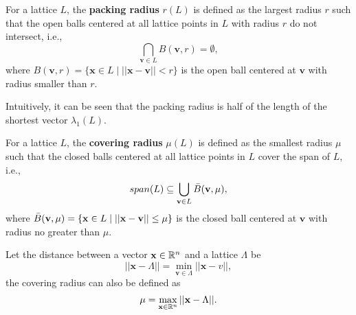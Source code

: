 \documentclass[../main.tex]{subfiles}
\begin{document}
\iffalse %
The function inside of the square root is in $\omega(\log n)$\footnote{It is called ``superlogarithm'' by \cite{micciancio07worst}.} The lemma remains true for all functions in $\omega(\log n)$. Another way of saying this is, 
\begin{equation*}
    \eta_{\epsilon}(L) \le \sqrt{\omega(\log n)} \cdot \lambda_n(L)
\end{equation*}
\fi

\iffalse
\begin{definition}
\reversemarginpar
{}
For a lattice $L$, the \textbf{packing radius} $r(L)$ is defined as the largest radius $r$ such that the open balls centered at all lattice points in $L$ with radius $r$ do not intersect, i.e.,  
\begin{equation*}
    \bigcap_{\mathbf{v} \in L} B(\mathbf{v},r) = \emptyset,
\end{equation*}
where $B(\mathbf{v},r)=\{\mathbf{x} \in L \mid ||\mathbf{x}-\mathbf{v}|| < r\}$ is the open ball centered at $\mathbf{v}$ with radius smaller than $r$.
\end{definition}
Intuitively, it can be seen that the packing radius is half of the length of the shortest vector $\lambda_1(L)$.

\begin{definition}
\reversemarginpar
{}
For a lattice $L$, the \textbf{covering radius} $\mu(L)$ is defined as the smallest radius $\mu$ such that the closed balls centered at all lattice points in $L$ cover the span of $L$, i.e., 
\begin{equation*}
    span(L) \subseteq \bigcup_{\mathbf{v} \in L} \Bar{B}(\mathbf{v}, \mu),
\end{equation*}
where $\Bar{B}(\mathbf{v},\mu)=\{\mathbf{x} \in L \mid ||\mathbf{x}-\mathbf{v}|| \le \mu\}$ is the closed ball centered at $\mathbf{v}$ with radius no greater than $\mu$.
\end{definition}

Let the distance between a vector $\mathbf{x} \in \mathbb{R}^n$ and a lattice $\Lambda$ be 
\begin{equation*}
    ||\mathbf{x} -\Lambda||=\min_{\mathbf{v} \in \Lambda} ||\mathbf{x}-v||,
\end{equation*}
the covering radius can also be defined as 
\begin{equation}
    \mu = \max_{\mathbf{x} \in \mathbb{R}^n} ||\mathbf{x}-\Lambda||.
\end{equation}
\end{document}
